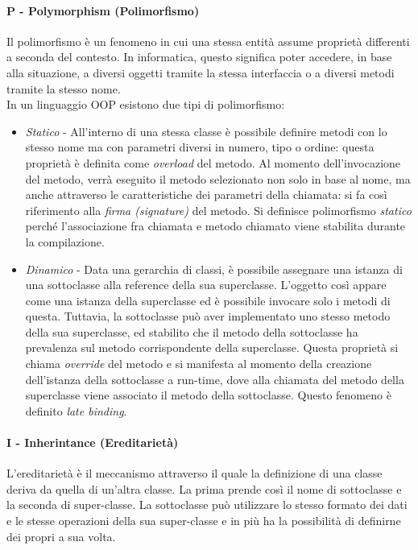 \documentclass{article}
\begin{document}
            \paragraph{P - Polymorphism (Polimorfismo)} Il polimorfismo è un fenomeno in cui una stessa entità assume proprietà differenti a seconda del contesto. In informatica, questo significa poter accedere, in base alla situazione, a diversi oggetti tramite la stessa interfaccia o a diversi metodi tramite la stesso nome.\\
                In un linguaggio OOP esistono due tipi di polimorfismo:
                \begin{itemize}
                    \item \textit{Statico} - All'interno di una stessa classe è possibile definire metodi con lo stesso nome ma con parametri diversi in numero, tipo o ordine: questa proprietà è definita come \textit{overload} del metodo. Al momento dell'invocazione del metodo, verrà eseguito il metodo selezionato non solo in base al nome, ma anche attraverso le caratteristiche dei parametri della chiamata: si fa così riferimento alla \textit{firma (signature)} del metodo. Si definisce polimorfismo \textit{statico} perché l'associazione fra chiamata e metodo chiamato viene stabilita durante la compilazione.
                    \item \textit{Dinamico} - Data una gerarchia di classi, è possibile assegnare una istanza di una sottoclasse alla reference della sua superclasse. L'oggetto così appare come una istanza della superclasse ed è possibile invocare solo i metodi di questa. Tuttavia, la sottoclasse può aver implementato uno stesso metodo della sua superclasse, ed stabilito che il metodo della sottoclasse ha prevalenza sul metodo corrispondente della superclasse. Questa proprietà si chiama \textit{override} del metodo e si manifesta al momento della creazione dell'istanza della sottoclasse a run-time, dove alla chiamata del metodo della superclasse viene associato il metodo della sottoclasse. Questo fenomeno è definito \textit{late binding}.
                \end{itemize}
            \paragraph{I - Inherintance (Ereditarietà)} L'ereditarietà è il meccanismo attraverso il quale la definizione di una classe deriva da quella di un'altra classe. La prima prende così il nome di sottoclasse e la seconda di super-classe. La sottoclasse può utilizzare lo stesso formato dei dati e le stesse operazioni della sua super-classe e in più ha la possibilità di definirne dei propri a sua volta.
            
\end{document}
